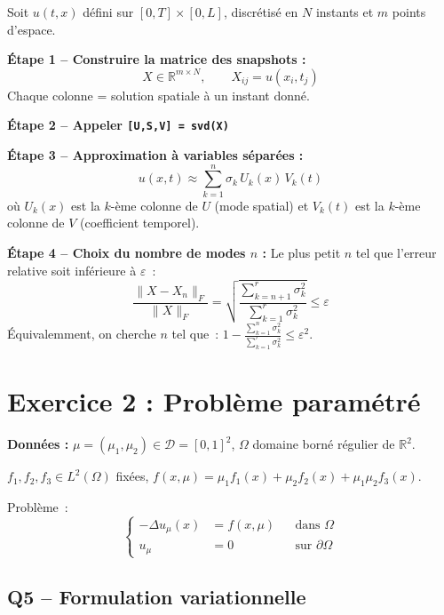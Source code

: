 \documentclass[11pt,a4paper]{article}
\begin{document}
\begin{formulabox}[Solution]
Soit $u(t,x)$ d\'efini sur $[0,T]\times[0,L]$, discr\'etis\'e en $N$ instants et $m$ points d'espace.

\textbf{\'Etape 1 -- Construire la matrice des snapshots :}
\[
X \in \mathbb{R}^{m\times N}, \qquad X_{ij} = u(x_i, t_j)
\]
Chaque colonne = solution spatiale \`a un instant donn\'e.

\textbf{\'Etape 2 -- Appeler \texttt{[U,S,V] = svd(X)}}

\textbf{\'Etape 3 -- Approximation \`a variables s\'epar\'ees :}
\[
\boxed{u(x,t) \approx \sum_{k=1}^{n} \sigma_k\, U_k(x)\, V_k(t)}
\]
o\`u $U_k(x)$ est la $k$-\`eme colonne de $U$ (mode spatial) et $V_k(t)$ est la $k$-\`eme colonne de $V$ (coefficient temporel).

\textbf{\'Etape 4 -- Choix du nombre de modes $n$ :} Le plus petit $n$ tel que l'erreur relative soit inf\'erieure \`a $\varepsilon$~:
\[
\boxed{\frac{\|X - X_n\|_F}{\|X\|_F} = \sqrt{\frac{\sum_{k=n+1}^{r}\sigma_k^2}{\sum_{k=1}^{r}\sigma_k^2}} \leq \varepsilon}
\]
\'Equivalemment, on cherche $n$ tel que~: $\displaystyle 1 - \frac{\sum_{k=1}^{n}\sigma_k^2}{\sum_{k=1}^{r}\sigma_k^2} \leq \varepsilon^2$.
\end{formulabox}

\section{Exercice 2 : Probl\`eme param\'etr\'e}

\textbf{Donn\'ees :} $\mu = (\mu_1,\mu_2) \in \mathcal{D} = [0,1]^2$, $\Omega$ domaine born\'e r\'egulier de $\mathbb{R}^2$.

$f_1, f_2, f_3 \in L^2(\Omega)$ fix\'ees, $f(x,\mu) = \mu_1 f_1(x) + \mu_2 f_2(x) + \mu_1\mu_2 f_3(x)$.

Probl\`eme~:
\[
\left\{
\begin{aligned}
-\Delta u_\mu(x) &= f(x,\mu) && \text{dans } \Omega \\
u_\mu &= 0 && \text{sur } \partial\Omega
\end{aligned}
\right.
\tag{1-2}
\]

\subsection{Q5 -- Formulation variationnelle}
\end{document}
